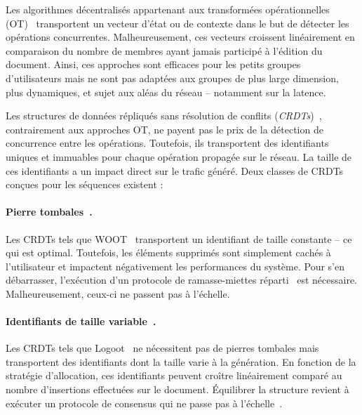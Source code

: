 Les algorithmes décentralisés appartenant aux transformées opérationnelles
(OT)~\cite{sun1998operational, sun2009contextbased} transportent un vecteur
d'état ou de contexte dans le but de détecter les opérations
concurrentes. Malheureusement, ces vecteurs croissent linéairement en
comparaison du nombre de membres ayant jamais participé à l'édition du
document. Ainsi, ces approches sont efficaces pour les petits groupes
d'utilisateurs mais ne sont pas adaptées aux groupes de plus large dimension,
plus dynamiques, et sujet aux aléas du réseau -- notamment sur la latence.

Les structures de données répliqués sans résolution de conflits
(\emph{CRDTs})~\cite{shapiro2011comprehensive, shapiro2011conflict,
burckhardt2014replicated}, contrairement aux approches OT, ne payent pas le prix
de la détection de concurrence entre les opérations. Toutefois, ils transportent
des identifiants uniques et immuables pour chaque opération propagée sur le
réseau. La taille de ces identifiants a un impact direct sur le trafic généré.
Deux classes de CRDTs conçues pour les séquences existent :

\paragraph{Pierre tombales~\cite{ahmed2011evaluating, attiya2016specification,
conway2014language, grishchenko2010deep, oster2006data, roh2011replicated,
weiss2007wooki, wu2010partial, yu2012stringwise}.} Les CRDTs tels que
WOOT~\cite{oster2006data} transportent un identifiant de taille constante -- ce
qui est optimal. Toutefois, les éléments supprimés sont simplement cachés à
l'utilisateur et impactent négativement les performances du système. Pour s'en
débarrasser, l'exécution d'un protocole de ramasse-miettes
réparti~\cite{abdullahi1998garbage} est nécessaire. Malheureusement, ceux-ci ne
passent pas à l'échelle.

\paragraph{Identifiants de taille variable~\cite{andre2013supporting,
 preguica2009commutative, weiss2009logoot}.} Les CRDTs tels que
Logoot~\cite{weiss2009logoot} ne nécessitent pas de pierres tombales mais
transportent des identifiants dont la taille varie à la génération. En fonction
de la stratégie d'allocation, ces identifiants peuvent croître linéairement
comparé au nombre d'insertions effectuées sur le document. Équilibrer la
structure revient à exécuter un protocole de consensus qui ne passe pas à
l'échelle~\cite{mostefaoui2015signature}.

